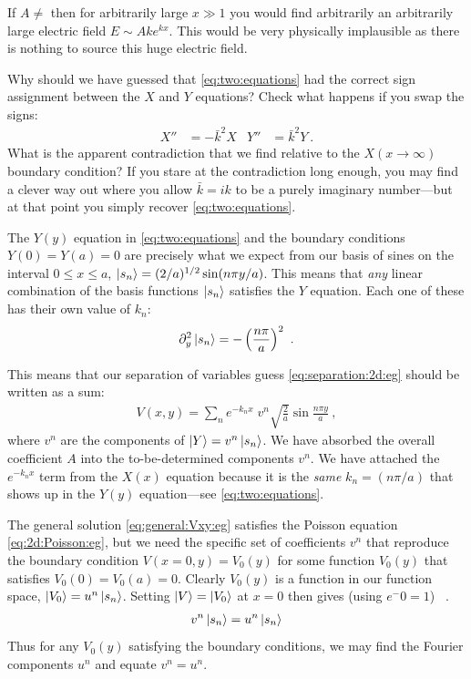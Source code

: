 \begin{example}
If $A\neq$ then for arbitrarily large $x\gg 1$ you would find arbitrarily an arbitrarily large electric field $E\sim Ake^{kx}$. This would be very physically implausible as there is nothing to  source this huge electric field.
\end{example}

\begin{exercise}\label{ex:two:equations:wrong:choice}
Why should we have guessed that \eqref{eq:two:equations} had the correct sign assignment between the $X$ and $Y$ equations? Check what happens if you swap the signs:
\begin{align}
    X'' &= -\bar k^2X 
    & Y''&= \bar k^2 Y \ .
    \label{eq:two:equations:wrong}
\end{align}
What is the apparent contradiction that we find relative to the $X(x\to\infty)$ boundary condition? If you stare at the contradiction long enough, you may find a clever way out where you allow $\bar k=ik$ to be a purely imaginary number---but at that point you simply recover \eqref{eq:two:equations}. 
\end{exercise}

The $Y(y)$ equation in \eqref{eq:two:equations} and the boundary conditions $Y(0)= Y(a) = 0$ are precisely what we expect from our basis of sines on the interval $0 \leq x \leq a$, $\left|s_n\right\rangle = (2/a)^{1/2}\sin (n\pi y/a)$. This means that \emph{any} linear combination of the basis functions $\left|s_n\right\rangle$ satisfies the $Y$ equation. Each one of these has their own value of $k_n$:
\begin{align}
    \partial_y^2 \left|s_n\right\rangle = -\left(\frac{n\pi}{a}\right)^2 \ .
\end{align}

This means that our separation of variables guess \eqref{eq:separation:2d:eg} should be written as a sum:
\begin{align}
    V(x,y) = \sum_n e^{-k_n x} \; v^n \sqrt{\frac{2}{a}} \sin \frac{n\pi y}{a} \ ,
    \label{eq:general:Vxy:eg}
\end{align}
where $v^n$ are the components of $\left|Y\right\rangle = v^n\left|s_n\right\rangle$. We have absorbed the overall coefficient $A$ into the to-be-determined components $v^n$. We have attached the $e^{-k_nx}$ term from the $X(x)$ equation because it is the \emph{same} $k_n = (n\pi/a)$ that shows up in the $Y(y)$ equation---see \eqref{eq:two:equations}.

The general solution \eqref{eq:general:Vxy:eg} satisfies the Poisson equation \eqref{eq:2d:Poisson:eg}, but we need the specific set of coefficients $v^n$ that reproduce the boundary condition $V(x=0,y) = V_0(y)$ for some function $V_0(y)$ that satisfies $V_0(0) = V_0(a) = 0$. Clearly $V_0(y)$ is a function in our function space, $\left|V_0\right\rangle = u^n \left|s_n\right\rangle$. Setting $\left|V\right\rangle = \left|V_0\right\rangle$ at $x=0$ then gives (using $e^-0 = 1$) \ .
\begin{align}
    v^n \left|s_n\right\rangle = u^n \left|s_n\right\rangle
\end{align}
Thus for any $V_0(y)$ satisfying the boundary conditions, we may find the Fourier components $u^n$ and equate $v^n = u^n$.


